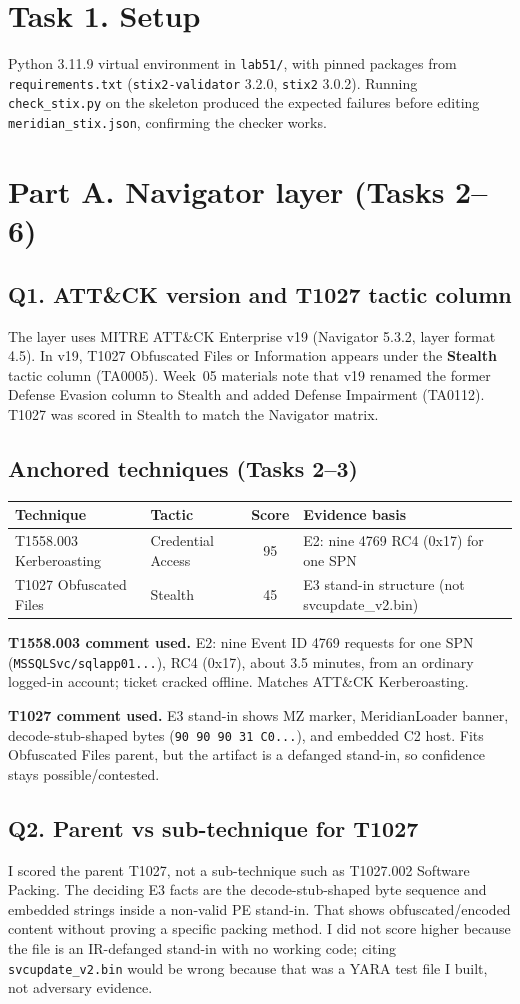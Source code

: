 \documentclass[11pt,letterpaper]{article}
\newcommand{\labpart}[1]{%
  \par\vspace{0.35em}%
  \Needspace{8\baselineskip}%
  \section*{#1}%
  \nopagebreak
}
\newcommand{\labstep}[1]{%
  \Needspace{6\baselineskip}%
  \subsection*{#1}%
  \nopagebreak
}
\begin{document}
\labpart{Task 1. Setup}

Python 3.11.9 virtual environment in \texttt{lab51/}, with pinned packages from \texttt{requirements.txt} (\texttt{stix2-validator} 3.2.0, \texttt{stix2} 3.0.2). Running \texttt{check\_stix.py} on the skeleton produced the expected failures before editing \texttt{meridian\_stix.json}, confirming the checker works.

\labpart{Part A. Navigator layer (Tasks 2--6)}

\labstep{Q1. ATT\&CK version and T1027 tactic column}

The layer uses MITRE ATT\&CK Enterprise v19 (Navigator 5.3.2, layer format 4.5). In v19, T1027 Obfuscated Files or Information appears under the \textbf{Stealth} tactic column (TA0005). Week~05 materials note that v19 renamed the former Defense Evasion column to Stealth and added Defense Impairment (TA0112). T1027 was scored in Stealth to match the Navigator matrix.

\labstep{Anchored techniques (Tasks 2--3)}

\begin{tabularx}{\textwidth}{@{}l l c Y@{}}
\toprule
\textbf{Technique} & \textbf{Tactic} & \textbf{Score} & \textbf{Evidence basis} \\
\midrule
T1558.003 Kerberoasting & Credential Access & 95 & E2: nine 4769 RC4 (0x17) for one SPN \\
T1027 Obfuscated Files & Stealth & 45 & E3 stand-in structure (not svcupdate\_v2.bin) \\
\bottomrule
\end{tabularx}

\textbf{T1558.003 comment used.} E2: nine Event ID 4769 requests for one SPN (\texttt{MSSQLSvc/sqlapp01...}), RC4 (0x17), about 3.5 minutes, from an ordinary logged-in account; ticket cracked offline. Matches ATT\&CK Kerberoasting.

\textbf{T1027 comment used.} E3 stand-in shows MZ marker, MeridianLoader banner, decode-stub-shaped bytes (\texttt{90 90 90 31 C0...}), and embedded C2 host. Fits Obfuscated Files parent, but the artifact is a defanged stand-in, so confidence stays possible/contested.

\labstep{Q2. Parent vs sub-technique for T1027}

I scored the parent T1027, not a sub-technique such as T1027.002 Software Packing. The deciding E3 facts are the decode-stub-shaped byte sequence and embedded strings inside a non-valid PE stand-in. That shows obfuscated/encoded content without proving a specific packing method. I did not score higher because the file is an IR-defanged stand-in with no working code; citing \texttt{svcupdate\_v2.bin} would be wrong because that was a YARA test file I built, not adversary evidence.
\end{document}
